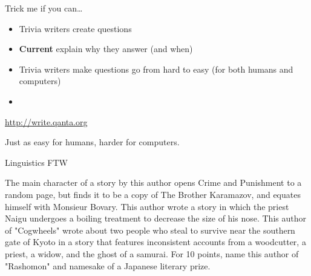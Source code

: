 \documentclass[xcolor=dvipsnames,xcolor=table]{beamer}
\newcommand{\fsi}[2]{
\begin{frame}[plain]
\vspace*{-1pt}
\makebox[\linewidth]{\texttt{[image: \#1]}}
\begin{center}
#2
\end{center}
\end{frame}
}
\newcommand{\gfxq}[2]{
\begin{center}
	\texttt{[image: qb/\#1]}
\end{center}
}
\begin{document}
\begin{frame}{Trick me if you can\dots}

  \begin{itemize}
  \item Trivia writers create questions
  \item {\bf Current} explain why they answer (and when)
  \item Trivia writers make questions go from hard to easy (for both
    humans and computers)
    \pause
    \item {} 
  \end{itemize}

\end{frame}





\fsi{qb/trick/brahms_0}{\href{http://write.qanta.org}{http://write.qanta.org}}
\fsi{qb/trick/brahms_1}{}
\fsi{qb/trick/brahms_2}{}
\fsi{qb/trick/brahms_3}{}
\fsi{qb/trick/brahms_4}{}
\fsi{qb/trick/brahms_5}{}


\fsi{qb/trick/round_one}{Just as easy for humans, harder for computers.}




\begin{frame}{Linguistics FTW}

  The main character of a story by \alert<2>{this author opens Crime and Punishment} to a
random page, but finds it to be a copy of The Brother Karamazov, and equates
himself with Monsieur Bovary. This author wrote a story in which the priest
Naigu undergoes a boiling treatment to decrease the size of his nose. This
author of "Cogwheels" wrote about two people who steal to survive near the
southern gate of Kyoto in a story that features inconsistent accounts from a
woodcutter, a priest, a widow, and the ghost of a samurai. For 10 points, name
this author of "Rashomon" and namesake of a Japanese literary prize. \\
\end{frame}
\end{document}
